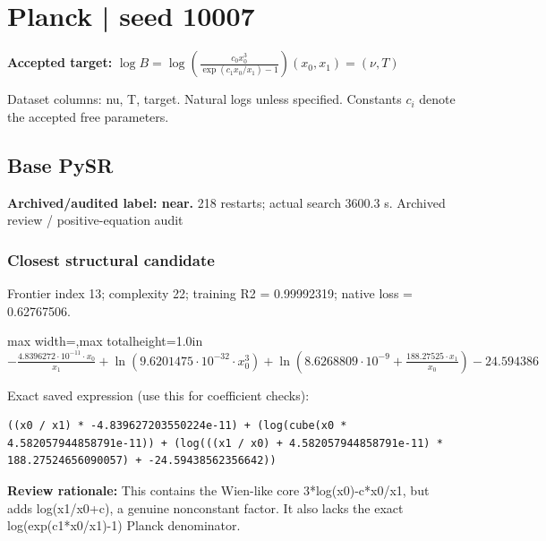 \documentclass[10pt,letterpaper,landscape]{article}
\begin{document}
\section*{Planck | seed 10007}
\textbf{Accepted target:} $\displaystyle \log B=\log\!\left(\frac{c_0 x_0^3}{\exp(c_1x_0/x_1)-1}\right)$\hfill $(x_0,x_1)=(\nu,T)$\par
{\small Dataset columns: nu, T, target. Natural logs unless specified. Constants $c_i$ denote the accepted free parameters.}\par\medskip
\begin{minipage}[t]{0.485\textwidth}
\subsection*{Base PySR}
\textbf{Archived/audited label: near.} 218 restarts; actual search 3600.3 s.
{\small Archived review / positive-equation audit}
\subsubsection*{Closest structural candidate}
Frontier index 13; complexity 22; training R2 = 0.99992319; native loss = 0.62767506.
\begin{center}\begin{adjustbox}{max width=\linewidth,max totalheight=1.0in}$\displaystyle - \frac{4.8396272 \cdot 10^{-11} \cdot x_{0}}{x_{1}} + \ln{\left(9.6201475 \cdot 10^{-32} \cdot x_{0}^{3} \right)} + \ln{\left(8.6268809 \cdot 10^{-9} + \frac{188.27525 \cdot x_{1}}{x_{0}} \right)} - 24.594386$\end{adjustbox}\end{center}
{\scriptsize Exact saved expression (use this for coefficient checks):}
\begin{lstlisting}
((x0 / x1) * -4.839627203550224e-11) + (log(cube(x0 * 4.582057944858791e-11)) + (log(((x1 / x0) + 4.582057944858791e-11) * 188.27524656090057) + -24.59438562356642))
\end{lstlisting}
{\small\textbf{Review rationale:} This contains the Wien-like core 3*log(x0)-c*x0/x1, but adds log(x1/x0+c), a genuine nonconstant factor. It also lacks the exact log(exp(c1*x0/x1)-1) Planck denominator.}

\end{minipage}
\end{document}
